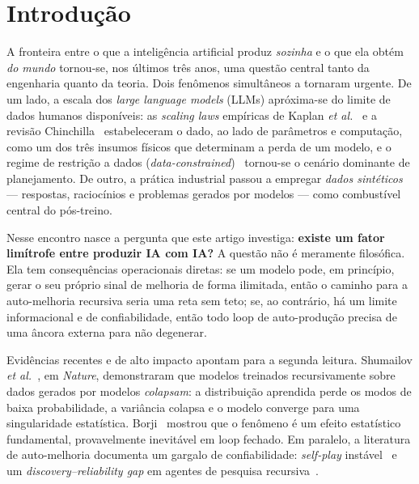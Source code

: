 \section{Introdução}\label{sec:intro}

A fronteira entre o que a inteligência artificial produz \emph{sozinha} e o que
ela obtém \emph{do mundo} tornou-se, nos últimos três anos, uma questão central
tanto da engenharia quanto da teoria. Dois fenômenos simultâneos a tornaram
urgente. De um lado, a escala dos \emph{large language models} (LLMs) apróxima-se
do limite de dados humanos disponíveis: as \emph{scaling laws} empíricas de
Kaplan \textit{et al.}~\parencite{Kaplan2020Scaling} e a revisão
Chinchilla~\parencite{Hoffmann2022Chinchilla} estabeleceram o dado, ao lado de
parâmetros e computação, como um dos três insumos físicos que determinam a perda
de um modelo, e o regime de restrição a dados
(\emph{data-constrained})~\parencite{Muennighoff2023DataConstrained} tornou-se o
cenário dominante de planejamento. De outro, a prática industrial passou a
empregar \emph{dados sintéticos} --- respostas, raciocínios e problemas gerados por
modelos --- como combustível central do pós-treino.

Nesse encontro nasce a pergunta que este artigo investiga: \textbf{existe um
fator limítrofe entre produzir IA com IA?} A questão não é meramente filosófica.
Ela tem consequências operacionais diretas: se um modelo pode, em princípio,
gerar o seu próprio sinal de melhoria de forma ilimitada, então o caminho para a
auto-melhoria recursiva seria uma reta sem teto; se, ao contrário, há um limite
informacional e de confiabilidade, então todo loop de auto-produção precisa de
uma âncora externa para não degenerar.

Evidências recentes e de alto impacto apontam para a segunda leitura.
Shumailov \textit{et al.}~\parencite{Shumailov2024Collapse}, em \emph{Nature},
demonstraram que modelos treinados recursivamente sobre dados gerados por
modelos \emph{colapsam}: a distribuição aprendida perde os modos de baixa
probabilidade, a variância colapsa e o modelo converge para uma singularidade
estatística. Borji~\parencite{Borji2024CollapseNote} mostrou que o fenômeno é um
efeito estatístico fundamental, provavelmente inevitável em loop fechado. Em
paralelo, a literatura de auto-melhoria documenta um gargalo de confiabilidade:
\emph{self-play} instável~\parencite{SelfPlayGuidance2026} e um
\emph{discovery--reliability gap} em agentes de pesquisa
recursiva~\parencite{RSIBench2026}.

